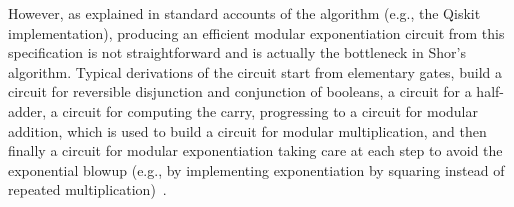 \noindent However, as explained in standard accounts of the algorithm (e.g., the Qiskit implementation), producing an efficient
modular exponentiation circuit from this specification  is not straightforward and is actually the bottleneck in Shor’s algorithm. Typical
derivations of the circuit start from elementary gates, build a circuit for reversible disjunction and conjunction of
booleans, a circuit for a half-adder, a circuit for computing the carry, progressing to a circuit for modular addition,
which is used to build a circuit for modular multiplication, and then finally a circuit for modular exponentiation
taking care at each step to avoid the exponential blowup (e.g., by implementing exponentiation by squaring instead of repeated
multiplication)~\cite{shorefficient}.




